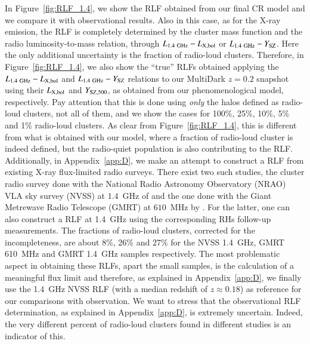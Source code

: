 \documentclass[traditabstract]{aa}
\newcommand{\rmn}{\mathrm}
\begin{document}
In Figure~\ref{fig:RLF_1.4}, we show the RLF obtained from our final CR model and we compare it with observational results. Also in this case, as for the X-ray emission, the RLF is completely determined by the cluster mass function and the radio luminosity-to-mass relation, through $L_{1.4~\rmn{GHz}}-L_{ \rm{X,bol}}$ or $L_{1.4~\rmn{GHz}}-Y_{\rm{SZ}}$. Here the only additional uncertainty is the fraction of radio-loud clusters. Therefore, in Figure~\ref{fig:RLF_1.4}, we also show the ``true'' RLFs obtained applying  the $L_{1.4~\rmn{GHz}}-L_{\rm{X,bol}}$ and $L_{1.4~\rmn{GHz}}-Y_{\rm{SZ}}$ relations to our MultiDark $z = 0.2$ snapshot using their $L_{\rm{X,bol}}$ and $Y_{\rm{SZ}, 500}$, as obtained from our phenomenological model, respectively. Pay attention that this is done using \emph{only} the halos defined as radio-loud clusters, not all of them, and we show the cases for 100\%, 25\%, 10\%, 5\% and 1\% radio-loud clusters. As clear from Figure~\ref{fig:RLF_1.4}, this is different from what is obtained with our model, where a fraction of radio-loud cluster is indeed defined, but the radio-quiet population is also contributing to the RLF. Additionally, in Appendix~\ref{app:D}, we make an attempt to construct a RLF from existing X-ray flux-limited radio surveys. There exist two such studies, the cluster radio survey done with the National Radio Astronomy Observatory (NRAO) VLA sky survey (NVSS) at $1.4$~GHz of \cite{1999NewA....4..141G} and the one done with the Giant Metrewave Radio Telescope (GMRT) at $610$~MHz by \cite{VenturiGMRT_1,VenturiGMRT_2}. For the latter, one can also construct a RLF at 1.4~GHz using the corresponding RHs follow-up measurements. The fractions of radio-loud clusters, corrected for the incompleteness, are about 8\%, 26\% and 27\% for the NVSS 1.4~GHz, GMRT 610~MHz and GMRT 1.4~GHz samples respectively. The most problematic aspect in obtaining these RLFs, apart the small samples, is the calculation of a meaningful flux limit and therefore, as explained in Appendix~\ref{app:D}, we finally use the 1.4~GHz NVSS RLF (with a median redshift of $z \approx 0.18$) as reference for our comparisons with observation. We want to stress that the observational RLF determination, as explained in Appendix~\ref{app:D}, is extremely uncertain. Indeed, the very different percent of radio-loud clusters found in different studies is an indicator of this. 
\end{document}
